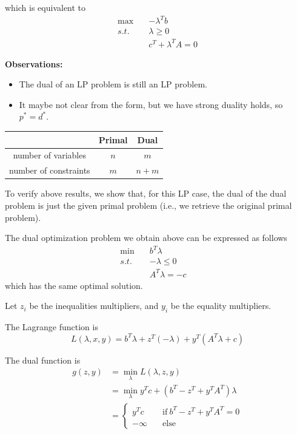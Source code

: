 which is equivalent to
\begin{align*}
\max\quad &-\lambda^Tb\\
s.t.\quad &\lambda\geq 0\\
&c^T+\lambda^TA=0
\end{align*}


\textbf{Observations:}
\begin{itemize}
	\item The dual of an LP problem is still an LP problem.
	
	\item It maybe not clear from the form, but we have strong duality holds, so $p^*=d^*$.
\end{itemize}

\begin{center}
\begin{tabular}{|c|c|c|}
	\hline 
	&Primal & Dual\\
	\hline  
	number of variables & $n$ & $m$\\
	\hline 
	number of constraints&$m$&$n+m$\\
	\hline 
\end{tabular}
\end{center}


\vspace{0.3cm}
To verify above results, we show that, for this LP case, the dual of the dual problem is just the given primal problem (i.e., we retrieve the original primal problem).

The dual optimization problem we obtain above can be expressed as follows
\begin{align*}
\min\quad &b^T\lambda\\
s.t.\quad &-\lambda\leq 0\quad\\
&A^T\lambda = -c\quad 
\end{align*}
which has the same optimal solution.

Let $z_i$ be the inequalities multipliers, and $y_i$ be the equality multipliers.

The Lagrange function is
$$L(\lambda,x,y) = b^T\lambda + z^T(-\lambda)+y^T(A^T\lambda + c)$$

The dual function is
\begin{align*}
g(z,y) 
&= \min_{\lambda}L(\lambda,z,y)\\
&= \min_{\lambda}y^Tc+(b^T-z^T+y^TA^T)\lambda\\
&=
\left\{
\begin{aligned}
y^Tc &\quad \text{if}\ b^T-z^T+y^TA^T=0 \\
-\infty &\quad\text{else}
\end{aligned}
\right.
\end{align*}

